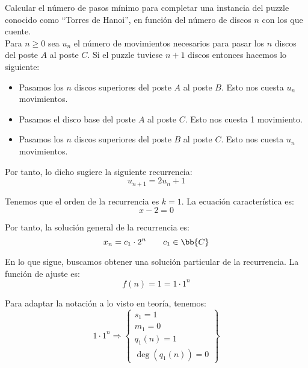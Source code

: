 \begin{ejercicio}
    Calcular el número de pasos mínimo para completar una instancia del puzzle conocido como ``Torres de Hanoi'', en función del número de discos $n$ con los que cuente.\\

    Para $n\geq 0$ sea $u_n$ el número de movimientos necesarios para pasar los $n$ discos
    del poste $A$ al poste $C$. Si el puzzle tuviese $n+1$ discos entonces hacemos lo siguiente:
    \begin{itemize}
        \item Pasamos los $n$ discos superiores del poste $A$ al poste $B$. Esto nos cuesta $u_n$ movimientos.
        \item Pasamos el disco base del poste $A$ al poste $C$. Esto nos cuesta 1 movimiento.
        \item Pasamos los $n$ discos superiores del poste $B$ al poste $C$. Esto nos cuesta $u_n$ movimientos.
    \end{itemize}

    Por tanto, lo dicho sugiere la siguiente recurrencia:
    \begin{equation*}
        u_{n+1} = 2u_n + 1
    \end{equation*}

    Tenemos que el orden de la recurrencia es $k=1$. La ecuación característica es:
    \begin{equation*}
        x-2 = 0
    \end{equation*}

    Por tanto, la solución general de la recurrencia es:
    \begin{equation*}
        x_n = c_1\cdot 2^n  \qquad c_1\in \bb{C}
    \end{equation*}

    En lo que sigue, buscamos obtener una solución particular de la recurrencia. La función de ajuste es:
    \begin{equation*}
        f(n) = 1 = 1\cdot 1^n
    \end{equation*}

    Para adaptar la notación a lo visto en teoría, tenemos:
    \begin{equation*}
        1\cdot 1^n\Longrightarrow \left\{\begin{array}{l}
            s_1 = 1 \\
            m_1 = 0\\
            q_1(n) = 1 \\
            \deg(q_1(n)) = 0
        \end{array}\right\}
    \end{equation*}
    

\end{ejercicio}
